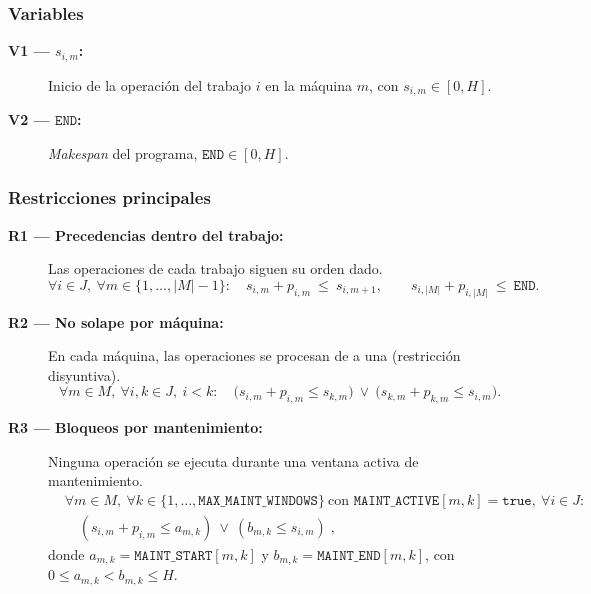 \subsubsection*{Variables}
\begin{description}
  \item[\textbf{V1 — \(s_{i,m}\):}] Inicio de la operación del trabajo \(i\) en la máquina \(m\), con \(s_{i,m}\in[0,H]\).
  \item[\textbf{V2 — \(\texttt{END}\):}] \emph{Makespan} del programa, \(\texttt{END}\in[0,H]\).
\end{description}

\subsubsection*{Restricciones principales}
\begin{description}
  \item[\textbf{R1 — Precedencias dentro del trabajo:}] Las operaciones de cada trabajo siguen su orden dado.
        \[
          \forall i\in J,\ \forall m\in\{1,\dots,|M|-1\}:\quad
          s_{i,m}+p_{i,m}\ \le\ s_{i,m+1},
          \qquad
          s_{i,|M|}+p_{i,|M|}\ \le\ \texttt{END}.
        \]

  \item[\textbf{R2 — No solape por máquina:}] En cada máquina, las operaciones se procesan de a una (restricción disyuntiva).
        \[
          \forall m\in M,\ \forall i,k\in J,\ i<k:\quad
          \big(s_{i,m}+p_{i,m}\le s_{k,m}\big)\ \lor\ \big(s_{k,m}+p_{k,m}\le s_{i,m}\big).
        \]

  \item[\textbf{R3 — Bloqueos por mantenimiento:}]
        Ninguna operación se ejecuta durante una ventana activa de mantenimiento.
        \begin{align}
           & \forall m\in M,\ \forall k\in\{1,\dots,\texttt{MAX\_MAINT\_WINDOWS}\}\ \text{con }\texttt{MAINT\_ACTIVE}[m,k]=\texttt{true},\ \forall i\in J: \nonumber \\
           & \quad (s_{i,m}+p_{i,m}\le a_{m,k})\ \lor\ (b_{m,k}\le s_{i,m})\;, \nonumber
        \end{align}
        donde \(a_{m,k}=\texttt{MAINT\_START}[m,k]\) y \(b_{m,k}=\texttt{MAINT\_END}[m,k]\), con \(0\le a_{m,k}<b_{m,k}\le H\).
\end{description}


